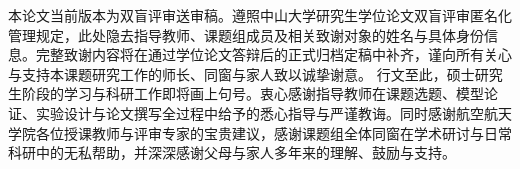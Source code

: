 
\begin{acknowledgements}

\ifsysublind
    本论文当前版本为双盲评审送审稿。遵照中山大学研究生学位论文双盲评审匿名化管理规定，此处隐去指导教师、课题组成员及相关致谢对象的姓名与具体身份信息。完整致谢内容将在通过学位论文答辩后的正式归档定稿中补齐，谨向所有关心与支持本课题研究工作的师长、同窗与家人致以诚挚谢意。
\else
    行文至此，硕士研究生阶段的学习与科研工作即将画上句号。衷心感谢指导教师在课题选题、模型论证、实验设计与论文撰写全过程中给予的悉心指导与严谨教诲。同时感谢航空航天学院各位授课教师与评审专家的宝贵建议，感谢课题组全体同窗在学术研讨与日常科研中的无私帮助，并深深感谢父母与家人多年来的理解、鼓励与支持。
\fi

\end{acknowledgements}
